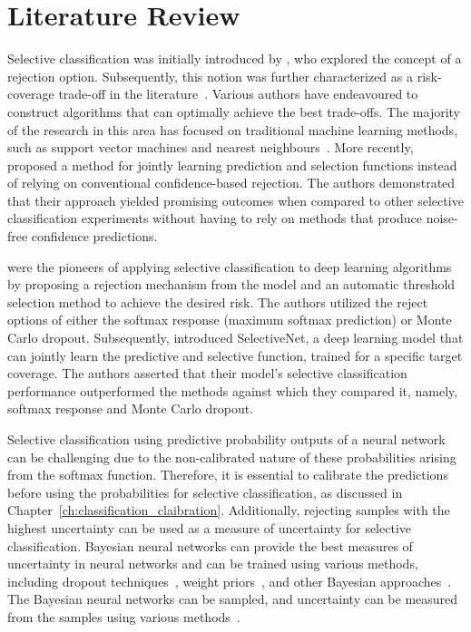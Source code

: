 \section{Literature Review}
\label{sec:selective_review}
Selective classification was initially introduced by \cite{chow1957optimum}, who explored the concept of a rejection option. Subsequently, this notion was further characterized as a risk-coverage trade-off in the literature~\citep{el2010foundations}. Various authors have endeavoured to construct algorithms that can optimally achieve the best trade-offs. The majority of the research in this area has focused on traditional machine learning methods, such as support vector machines and nearest neighbours~\citep{hellman1970nearest,fumera2002support,wiener2015agnostic}. More recently, \cite{cortes2016learning} proposed a method for jointly learning prediction and selection functions instead of relying on conventional confidence-based rejection. The authors demonstrated that their approach yielded promising outcomes when compared to other selective classification experiments without having to rely on methods that produce noise-free confidence predictions.

\cite{geifman2017selective} were the pioneers of applying selective classification to deep learning algorithms by proposing a rejection mechanism from the model and an automatic threshold selection method to achieve the desired risk. The authors utilized the reject options of either the softmax response (maximum softmax prediction) or Monte Carlo dropout. Subsequently, \cite{selective2019geifman} introduced SelectiveNet, a deep learning model that can jointly learn the predictive and selective function, trained for a specific target coverage. The authors asserted that their model's selective classification performance outperformed the methods against which they compared it, namely, softmax response and Monte Carlo dropout.

Selective classification using predictive probability outputs of a neural network can be challenging due to the non-calibrated nature of these probabilities arising from the softmax function. Therefore, it is essential to calibrate the predictions before using the probabilities for selective classification, as discussed in Chapter~\ref{ch:classification_claibration}. Additionally, rejecting samples with the highest uncertainty can be used as a measure of uncertainty for selective classification. Bayesian neural networks can provide the best measures of uncertainty in neural networks and can be trained using various methods, including dropout techniques~\citep{gal2016dropout}, weight priors~\citep{blundell2015weight}, and other Bayesian approaches~\citep{mackay1992bayesian}. The Bayesian neural networks can be sampled, and uncertainty can be measured from the samples using various methods~\citep{Gal2016Uncertainty}.



